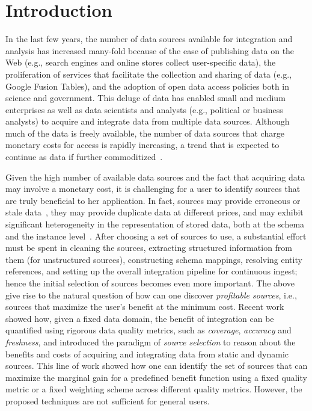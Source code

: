 \documentclass{sig-alternate}
\begin{document}
\section{Introduction}
In the last few years, the number of data sources available for integration and analysis has increased many-fold because of the ease of publishing data on the Web (e.g., search engines and online stores collect user-specific data), the proliferation of services that facilitate the collection and sharing of data (e.g., Google Fusion Tables), and  the adoption of open data access policies both in science and government. This deluge of data has enabled small and medium enterprises as well as data scientists and analysts (e.g., political or business analysts) to acquire and integrate data from multiple data sources. Although much of the data is freely available, the number of data sources that charge monetary costs for access is rapidly increasing, a trend that is expected to continue as data if further commoditized~\cite{balazinska:vldb11}. 

Given the high number of available data sources and the fact that acquiring data may involve a monetary cost, it is challenging for a user to identify sources that are truly beneficial to her application. In fact, sources may provide erroneous or stale data~\cite{Dong_vldb:2009, li:2012}, they may provide duplicate data at different prices, and may exhibit significant heterogeneity in the representation of stored data, both at the schema and the instance level~\cite{bronzi:2013, li:2012, dassarma:2012}. After choosing a set of sources to use, a substantial effort must be spent in cleaning the sources, extracting structured information from them (for unstructured sources), constructing schema mappings, resolving entity references, and setting up the overall integration pipeline for continuous ingest; hence the initial selection of sources becomes even more important. The above give rise to the natural question of how can one discover {\em profitable sources}, i.e., sources that maximize the user's benefit at the minimum cost. Recent work~\cite{dong:vldb13,rekatsinas:2014} showed how, given a fixed data domain, the benefit of integration can be quantified using rigorous data quality metrics, such as {\em coverage}, {\em accuracy} and {\em freshness}, and introduced the paradigm of {\em source selection} to reason about the benefits and costs of acquiring and integrating data from static and dynamic sources. This line of work showed how one can identify the set of sources that can maximize the marginal gain for a predefined benefit function using a fixed quality metric or a fixed weighting scheme across different quality metrics. However, the proposed techniques are not sufficient for general users. 
\end{document}
